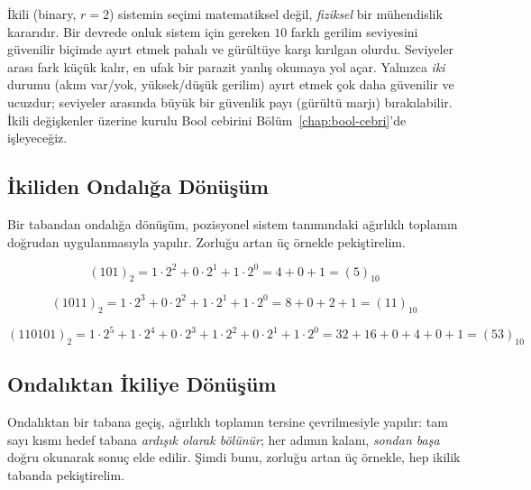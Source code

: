 \begin{bilginot}
İkili (binary, $r=2$) sistemin seçimi matematiksel değil, \emph{fiziksel} bir mühendislik
kararıdır. Bir devrede onluk sistem için gereken $10$ farklı gerilim seviyesini güvenilir
biçimde ayırt etmek pahalı ve gürültüye karşı kırılgan olurdu. Seviyeler arası fark küçük
kalır, en ufak bir parazit yanlış okumaya yol açar. Yalnızca \emph{iki} durumu (akım var/yok,
yüksek/düşük gerilim) ayırt etmek çok daha güvenilir ve ucuzdur; seviyeler arasında büyük bir
güvenlik payı (gürültü marjı) bırakılabilir. İkili değişkenler üzerine kurulu Bool cebirini
Bölüm~\ref{chap:bool-cebri}'de işleyeceğiz.
\end{bilginot}

\subsection{İkiliden Ondalığa Dönüşüm}
\label{sec:ikili-ondalik}

Bir tabandan ondalığa dönüşüm, pozisyonel sistem tanımındaki ağırlıklı toplamın doğrudan
uygulanmasıyla yapılır. Zorluğu artan üç örnekle pekiştirelim.

\begin{ornek}
\[
(101)_2 = 1\cdot2^2+0\cdot2^1+1\cdot2^0 = 4+0+1 = (5)_{10}
\]
\end{ornek}

\begin{ornek}
\[
(1011)_2 = 1\cdot2^3+0\cdot2^2+1\cdot2^1+1\cdot2^0 = 8+0+2+1 = (11)_{10}
\]
\end{ornek}

\begin{ornek}
\[
(110101)_2 = 1\cdot2^5+1\cdot2^4+0\cdot2^3+1\cdot2^2+0\cdot2^1+1\cdot2^0 = 32+16+0+4+0+1 = (53)_{10}
\]
\end{ornek}

\subsection{Ondalıktan İkiliye Dönüşüm}
\label{sec:ondalik-ikili}

Ondalıktan bir tabana geçiş, ağırlıklı toplamın tersine çevrilmesiyle yapılır: tam sayı kısmı
hedef tabana \emph{ardışık olarak bölünür}; her adımın kalanı, \emph{sondan başa} doğru
okunarak sonuç elde edilir. Şimdi bunu, zorluğu artan üç örnekle, hep ikilik tabanda
pekiştirelim.

